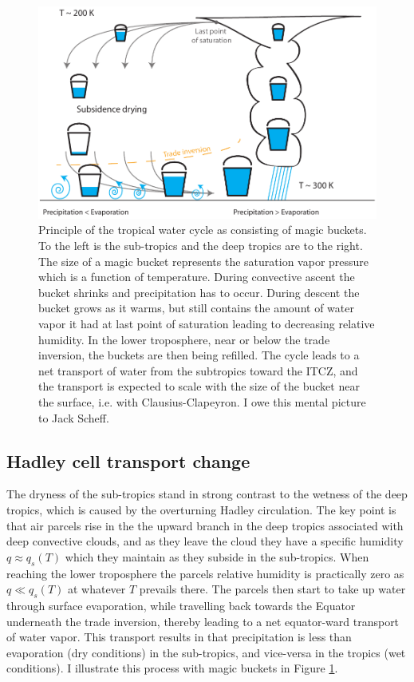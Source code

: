 \documentclass[12pt]{book}
\begin{document}
\begin{figure}
\begin{center}
\includegraphics[width=13 cm]{../Illustrations/Water_cycle_buckets.pdf}
\end{center}
\caption{ Principle of the tropical water cycle as consisting of magic buckets. To the left is the sub-tropics and the deep tropics are to the right. The size of a magic bucket represents the saturation vapor pressure which is a function of temperature. During convective ascent the bucket shrinks and precipitation has to occur. During descent the bucket grows as it warms, but still contains the amount of water vapor it had at last point of saturation leading to decreasing relative humidity. In the lower troposphere, near or below the trade inversion, the buckets are then being refilled. The cycle leads to a net transport of water from the subtropics toward the ITCZ, and the transport is expected to scale with the size of the bucket near the surface, i.e. with Clausius-Clapeyron. I owe this mental picture to Jack Scheff. } 
\label{fig:water_cycle_buckets}
\end{figure}

\subsection{Hadley cell transport change}
The dryness of the sub-tropics stand in strong contrast to the wetness of the deep tropics, which is caused by the overturning Hadley circulation. The key point is that air parcels rise in the the upward branch in the deep tropics associated with deep convective clouds, and as they leave the cloud they have a specific humidity $q \approx q_s (T)$ which they maintain as they subside in the sub-tropics. When reaching the lower troposphere the parcels relative humidity is practically zero as $q \ll q_s(T)$ at whatever $T$ prevails there. The parcels then start to take up water through surface evaporation, while travelling back towards the Equator underneath the trade inversion, thereby leading to a net equator-ward transport of water vapor. This transport results in that precipitation is less than evaporation (dry conditions) in the sub-tropics, and vice-versa in the tropics (wet conditions).
I illustrate this process with magic buckets in Figure \ref{fig:water_cycle_buckets}. 
\end{document}
